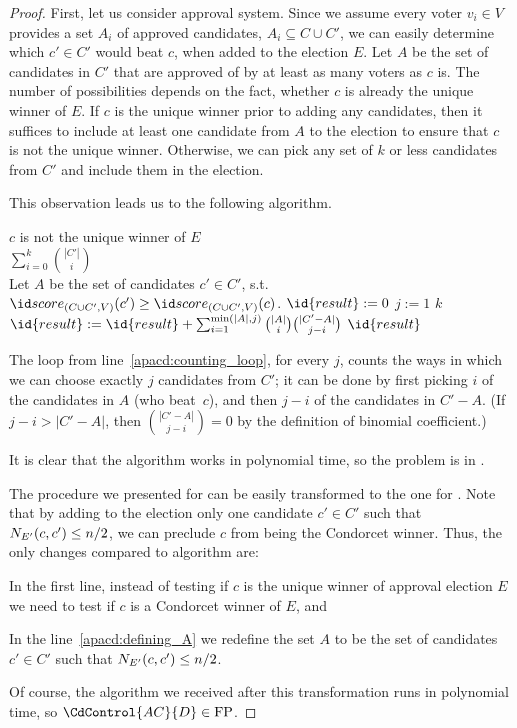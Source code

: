 \begin{proof}
First, let us consider approval system.
Since we assume every voter $v_i\in V$ provides a set $A_i$ of approved candidates, $A_i\subseteq C\cup C'$, we can easily determine which $c'\in C'$ would beat $c$, when added to the election $E$.
Let $A$ be the set of candidates in $C'$ that are approved of by at least as many voters as $c$ is.
The number of possibilities depends on the fact, whether $c$ is already the unique winner of $E$.
If $c$ is the unique winner prior to adding any candidates, then it suffices to include at least one candidate from $A$ to the election to ensure that $c$ is not the unique winner.
Otherwise, we can pick any set of $k$ or less candidates from $C'$ and include them in the election.

This observation leads us to the following algorithm.

\begin{codebox}
\li	\If $c$ is not the unique winner of $E$ \\[-4mm] \label{apacd:checking_c}
\li		\Then \Return $\sum_{i=0}^k\binom{|C'|}{i}$ \\[-4mm] \label{apacd:returning_result1}
		\End
\li	Let $A$ be the set of candidates $c'\in C'$\!, s.t.\ $\score{(C\cup C',V)}(c')\ge\score{(C\cup C',V)}(c)$. \label{apacd:defining_A}
\li	$\id{result}:=0$ \label{apacd:result_init}
\li	\For $j:=1$ \To $k$ \label{apacd:counting_loop}
\li		\Do $\id{result}:=\id{result}+\sum_{i=1}^{\min(|A|,j)}\binom{|A|}{i}\binom{|C'-A|}{j-i}$ \label{apacd:counting}
		\End
\li	\Return $\id{result}$ \label{apacd:returning_result2}
\end{codebox}

The loop from line~\ref{apacd:counting_loop}, for every $j$, counts the ways in which we can choose exactly $j$ candidates from $C'$; it can be done by first picking $i$ of the candidates in $A$ (who beat~$c$), and then $j-i$ of the candidates in $C'-A$.
(If $j-i>|C'-A|$, then $\binom{|C'-A|}{j-i}=0$ by the definition of binomial coefficient.)

It is clear that the algorithm works in polynomial time, so the problem  is in \FPclass.

The procedure we presented for  can be easily transformed to the one for .
Note that by adding to the election only one candidate $c'\in C'$ such that $N_{E'}(c,c')\le n/2$, we can preclude $c$ from being the Condorcet winner.
Thus, the only changes compared to algorithm  are:
\begin{Enumerate}
    \item In the first line, instead of testing if $c$ is the unique winner of approval election $E$ we need to test if $c$ is a Condorcet winner of $E$, and
	\item In the line~\ref{apacd:defining_A} we redefine the set $A$ to be the set of candidates $c'\in C'$ such that $N_{E'}(c,c')\le n/2$.
\end{Enumerate}

Of course, the algorithm we received after this transformation runs in polynomial time, so $\CdControl{AC}{D}\in\FPclass$.
\end{proof}

